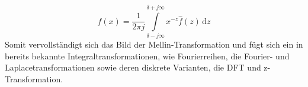 \begin{equation}
    f(x) = 
    \frac{1}{2\pi j} 
    \int\limits_{\delta -j\infty}^{\delta +j\infty} 
    x^{-z} \hat{f}(z) \,\mathrm{d}z
    \label{mellin:mellininv}
\end{equation}
Somit vervollständigt sich das Bild der Mellin-Transformation und fügt 
sich ein in bereits bekannte Integraltransformationen, wie Fourierreihen, 
die Fourier- und Laplacetransformationen sowie deren diskrete Varianten, 
die DFT und z-Transformation.



